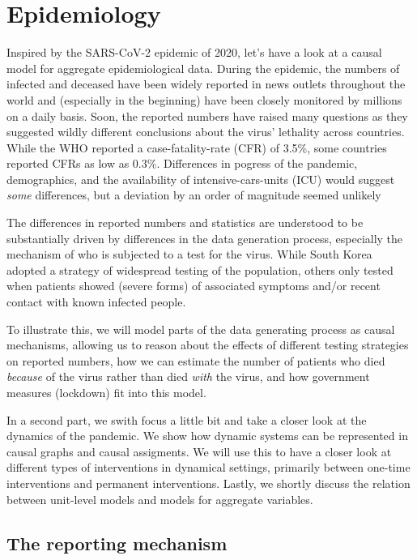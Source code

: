 \documentclass[
]{book}
\theoremstyle{definition}
\theoremstyle{definition}
\theoremstyle{definition}
\theoremstyle{remark}
\begin{document}
\hypertarget{epidemiology}{%
\section{Epidemiology}\label{epidemiology}}

Inspired by the SARS-CoV-2 epidemic of 2020, let's have a look at a causal model for aggregate epidemiological data. During the epidemic, the numbers of infected and deceased have been widely reported in news outlets throughout the world and (especially in the beginning) have been closely monitored by millions on a daily basis. Soon, the reported numbers have raised many questions as they suggested wildly different conclusions about the virus' lethality across countries. While the WHO reported a case-fatality-rate (CFR) of 3.5\%, some countries reported CFRs as low as 0.3\%. Differences in pogress of the pandemic, demographics, and the availability of intensive-cars-units (ICU) would suggest \emph{some} differences, but a deviation by an order of magnitude seemed unlikely

The differences in reported numbers and statistics are understood to be substantially driven by differences in the data generation process, especially the mechanism of who is subjected to a test for the virus. While South Korea adopted a strategy of widespread testing of the population, others only tested when patients showed (severe forms) of associated symptoms and/or recent contact with known infected people.

To illustrate this, we will model parts of the data generating process as causal mechanisms, allowing us to reason about the effects of different testing strategies on reported numbers, how we can estimate the number of patients who died \emph{because} of the virus rather than died \emph{with} the virus, and how government measures (lockdown) fit into this model.

In a second part, we swith focus a little bit and take a closer look at the dynamics of the pandemic. We show how dynamic systems can be represented in causal graphs and causal assigments. We will use this to have a closer look at different types of interventions in dynamical settings, primarily between one-time interventions and permanent interventions. Lastly, we shortly discuss the relation between unit-level models and models for aggregate variables.

\hypertarget{the-reporting-mechanism}{%
\subsection{The reporting mechanism}\label{the-reporting-mechanism}}
\end{document}

